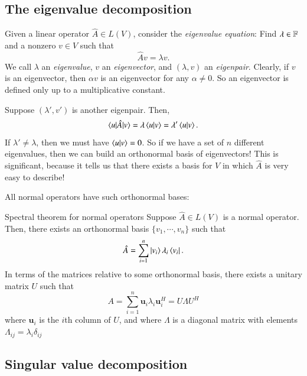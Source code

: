 \subsection{The eigenvalue decomposition}

Given a linear operator $\hat{A} \in L(V)$, consider the \emph{eigenvalue equation}: Find $\lambda \in \mathbb{F}$ and a nonzero $v \in V$ such that
\begin{equation}
    \hat{A} v = \lambda v.
\end{equation}
We call $\lambda$ an \emph{eigenvalue}, $v$ an \emph{eigenvector}, and $(\lambda,v)$ an \emph{eigenpair}. Clearly, if $v$ is an eigenvector, then $\alpha v$ is an eigenvector for any $\alpha\neq 0$. So an eigenvector is defined only up to a multiplicative constant.

Suppose $(\lambda',v')$ is another eigenpair. Then,
\begin{equation}
\braket{u|\hat{A}|v} = \lambda \braket{u|v} = \lambda' \braket{u|v}. 
\end{equation}
If $\lambda' \neq \lambda$, then we must have $\braket{u|v} = 0$. So if we have a set of $n$ different eigenvalues, then we can build an orthonormal basis of eigenvectors! This is significant, because it tells us that there exists a basis for $V$ in which $\hat{A}$ is very easy to describe!

All normal operators have such orthonormal bases:
\begin{myTheorem}{Spectral theorem for normal operators}{}
    Suppose $\hat{A} \in L(V)$ is a normal operator. Then, there exists an orthonormal basis $\{v_1,\cdots,v_n\}$ such that
    \begin{equation}
        \hat{A} = \sum_{i=1}^n \ket{v_i} \lambda_i \bra{v_i}.
    \end{equation}
    In terms of the matrices relative to some orthonormal basis, there exists a unitary matrix $U$ such that
    \begin{equation}
        A = \sum_{i=1}^n \mathbf{u}_i \lambda_i \mathbf{u}_i^H = U \Lambda U^H
    \end{equation}
    where $\mathbf{u}_i$ is the $i$th column of $U$, and where $\Lambda$ is a diagonal matrix with elements $\Lambda_{ij} = \lambda_i \delta_{ij}$
\end{myTheorem}


\subsection{Singular value decomposition}

